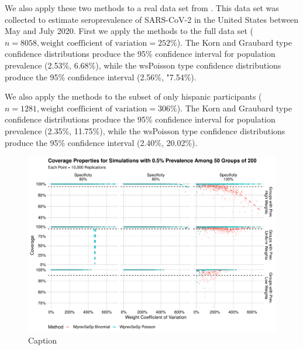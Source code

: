 \documentclass[AMA,STIX1COL]{WileyNJD-v2}
\begin{document}
We also apply these two methods to a real data set from \cite{Kali:2021}.
This data set was collected to estimate seroprevalence of SARS-CoV-2 in the United States between May and July 2020.
First we apply the methods to the full data set (\( n =  8058, \text{weight coefficient of variation} = 252\%\)).
The Korn and Graubard type confidence distributions produce the 95\% confidence interval for population prevalence (2.53\%, 6.68\%), while the wsPoisson type confidence distributions produce the 95\% confidence interval (2.56\%, "7.54\%).

We also apply the methods to the subset of only hispanic participants (\( n = 1281, \text{weight coefficient of variation} = 306\% \)).
The Korn and Graubard type confidence distributions produce the 95\% confidence interval for population prevalence (2.35\%, 11.75\%), while the wsPoisson type confidence distributions produce the 95\% confidence interval (2.40\%, 20.02\%).

\begin{figure}
    \centering
    \includegraphics[width=\textwidth]{figures/imperfect_coverage_50_0_005_reduced.pdf}
    \caption{Caption}
    \label{fig:imperfect_coverage_50_0_005_reduced}
\end{figure}
\end{document}
